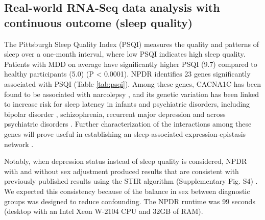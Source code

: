 \documentclass[10pt]{article}
\begin{document}
\subsection{Real-world RNA-Seq data analysis with continuous outcome (sleep quality)}
The Pittsburgh Sleep Quality Index (PSQI) measures the quality and patterns of sleep over a one-month interval, where low PSQI indicates high sleep quality.
Patients with MDD on average have significantly higher PSQI (9.7) compared to healthy participants (5.0) (P < 0.0001).
NPDR identifies 23 genes significantly associated with PSQI (Table \ref{tab:psqi}).
Among these genes, CACNA1C has been found to be associated with narcolepsy \cite{shimada2010}, and its genetic variation has been linked to increase risk for sleep latency in infants \cite{kantojarvi2017} and psychiatric disorders, including bipolar disorder \cite{franke2010}, schizophrenia, recurrent major depression \cite{green2009} and across psychiatric disorders \cite{crossdisorder2013, lotan2014}.
Further characterization of the interactions among these genes will prove useful in establishing an sleep-associated expression-epistasis network \cite{lareau15, mckinney2009capturing}.

Notably, when depression status instead of sleep quality is considered, NPDR with and without sex adjustment produced results that are consistent with previously published results using the STIR algorithm (Supplementary Fig. S4) \cite{stir}.
We expected this consistency because of the balance in sex between diagnostic groups was designed to reduce confounding.
The NPDR runtime was 99 seconds (desktop with an Intel Xeon W-2104 CPU and 32GB of RAM).
\end{document}
